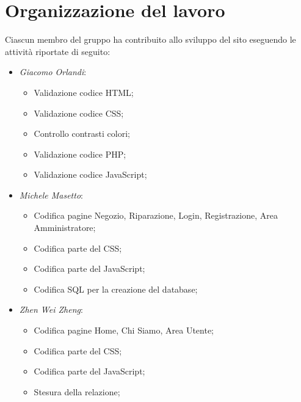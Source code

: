 \section{Organizzazione del lavoro}
Ciascun membro del gruppo ha contribuito allo sviluppo del sito eseguendo le
attività riportate di seguito:
\begin{itemize}
	\item \textit{Giacomo Orlandi}:
	\begin{itemize}
	\item Validazione codice HTML;
	\item Validazione codice CSS;
	\item Controllo contrasti colori;
	\item Validazione codice PHP;
	\item Validazione codice JavaScript;
	\end{itemize}

	\item \textit{Michele Masetto}:
	\begin{itemize}
	\item Codifica pagine Negozio, Riparazione, Login, Registrazione, Area Amministratore;
	\item Codifica parte del CSS;
	\item Codifica parte del JavaScript;
	\item Codifica SQL per la creazione del database;
	\end{itemize}

	\item \textit{Zhen Wei Zheng}:
	\begin{itemize}
	\item Codifica pagine Home, Chi Siamo, Area Utente;
	\item Codifica parte del CSS;
	\item Codifica parte del JavaScript;
	\item Stesura della relazione;
	\end{itemize}

\end{itemize}